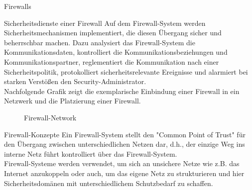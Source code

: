 \begin{section}{Firewalls}
  \label{Sicherheitsdienste einer Firewall}
  \begin{subsection}{Sicherheitsdienste einer Firewall}
  	Auf dem Firewall-System werden Sicherheitsmechanismen implementiert, die diesen Übergang 
  	sicher und beherrschbar machen. Dazu analysiert das Firewall-System die Kommunikationsdaten, 
  	kontrolliert die Kommunikationsbeziehungen und Kommunikationspartner, 
  	reglementiert die Kommunikation nach einer Sicherheitspolitik, protokolliert sicherheitsrelevante 
  	Ereignisse und alarmiert bei starken Verstößen den Security-Administrator. \\
  	Nachfolgende Grafik zeigt die exemplarische Einbindung einer Firewall in ein Netzwerk und die Platzierung einer Firewall.
  	\begin{figure}[htbp]
		\centering
		\caption[Firewall:Network]{Firewall-Network}
		\label{Firewall_Network}
	\end{figure}
  \end{subsection}
  \pagebreak
  
  \label{Firewall-Konzepte}
  \begin{subsection}{Firewall-Konzepte}
  	Ein Firewall-System stellt den "Common Point of Trust" für den Übergang zwischen 
  	unterschiedlichen Netzen dar, d.h., der einzige Weg ins interne Netz führt kontrolliert über das Firewall-System.
  	\\
  	Firewall-Systeme werden verwendet, um sich an unsichere Netze wie z.B. das Internet anzukoppeln 
  	oder auch, um das eigene Netz zu strukturieren und hier 
  	Sicherheitsdomänen mit unterschiedlichem Schutzbedarf zu schaffen.
  	

\end{subsection}
\end{section}
